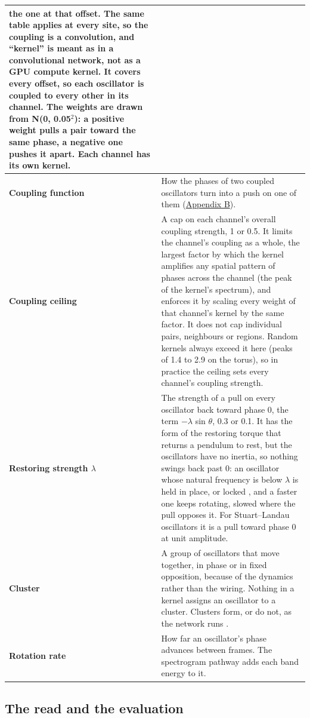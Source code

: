 \documentclass{article}
\begin{document}
{\begin{longtable}[]{@{}
  >{\raggedright\arraybackslash}p{}
  >{\raggedright\arraybackslash}p{}@{}}
the one at that offset. The same table applies at every site, so the
coupling is a convolution, and ``kernel'' is meant as in a convolutional
network, not as a GPU compute kernel. It covers every offset, so each
oscillator is coupled to every other in its channel. The weights are
drawn from N(0, 0.05\ensuremath{^{2}}): a positive weight pulls a pair
toward the same phase, a negative one pushes it apart. Each channel has
its own kernel. \\
\cmidrule{1-2}\textbf{Coupling function} & How the phases of two coupled
oscillators turn into a push on one of them (\hyperref[sec-B]{Appendix
B}). \\
\cmidrule{1-2}\textbf{Coupling ceiling} & A cap on each channel's
overall coupling strength, 1 or 0.5. It limits the channel's coupling as
a whole, the largest factor by which the kernel amplifies any spatial
pattern of phases across the channel (the peak of the kernel's
spectrum), and enforces it by scaling every weight of that channel's
kernel by the same factor. It does not cap individual pairs, neighbours
or regions. Random kernels always exceed it here (peaks of 1.4 to 2.9 on
the torus), so in practice the ceiling sets every channel's coupling
strength. \\
\cmidrule{1-2}\textbf{Restoring strength \ensuremath{\lambda}} & The
strength of a pull on every oscillator back toward phase 0, the term
\ensuremath{-\lambda} sin \ensuremath{\theta}, 0.3 or 0.1. It has the
form of the restoring torque that returns a pendulum to rest, but the
oscillators have no inertia, so nothing swings back past 0: an
oscillator whose natural frequency is below \ensuremath{\lambda} is held
in place, or locked \citep{adler1946}, and a faster one keeps rotating,
slowed where the pull opposes it. For Stuart--Landau oscillators it is a
pull toward phase 0 at unit amplitude. \\
\cmidrule{1-2}\textbf{Cluster} & A group of oscillators that move
together, in phase or in fixed opposition, because of the dynamics
rather than the wiring. Nothing in a kernel assigns an oscillator to a
cluster. Clusters form, or do not, as the network runs
\citep{pikovsky2001}. \\
\cmidrule{1-2}\textbf{Rotation rate} & How far an oscillator's phase
advances between frames. The spectrogram pathway adds each band energy
to it. \\
\end{longtable}
}

\subsection{The read and the evaluation}\label{sec-A-4}
\end{document}
